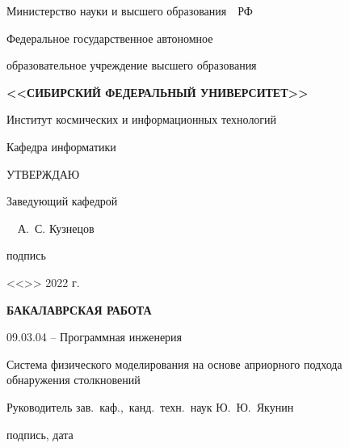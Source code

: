 \begin{spacing}{1}
    \setlength{\parindent}{0cm}

    \centerline{Министерство науки и высшего образования~~РФ}

    \centerline{\small Федеральное государственное автономное}

    \centerline{\small образовательное учреждение высшего образования}

    \centerline{\small\textbf{\MakeUppercase{<<Сибирский Федеральный Университет>>}}}

    \vspace{8pt}

    \centerline{{Институт космических и информационных технологий}}

    \centerline{{Кафедра информатики}}

    \vspace{10pt}

    \hfill\begin{minipage}{5.5cm}
        УТВЕРЖДАЮ

        Заведующий кафедрой

        \uline{\hfill}~~А.~С. Кузнецов

        \vspace{-4pt}
        {\footnotesize \hspace{2.5ex} подпись}

        <<\uline{\hspace{3ex}}>> \uline{\hspace{9ex}} 2022 г.
    \end{minipage}

    \vfill

    \centerline{\bf БАКАЛАВРСКАЯ РАБОТА}
    \vspace{8pt}
    \vspace{8pt}

    \centerline{{09.03.04 -- Программная инженерия}}
    \vspace{10pt}

    \begin{centering}

        {Система физического моделирования на основе априорного подхода}\\
        {обнаружения столкновений}

    \end{centering}

    \vfill
    \vfill
    \vfill

    Руководитель
    \hfill
    \uline{\hspace{10ex}}
    \hspace{3.5ex}
    {зав.~каф.,~канд.~техн.~наук}
    \hspace{2ex}
    {Ю.~Ю.~Якунин}
    \par
    \vspace{-4pt}
    \par
    \hfill
    {\footnotesize подпись, дата}
    \hspace{46.1ex}


\end{spacing}
